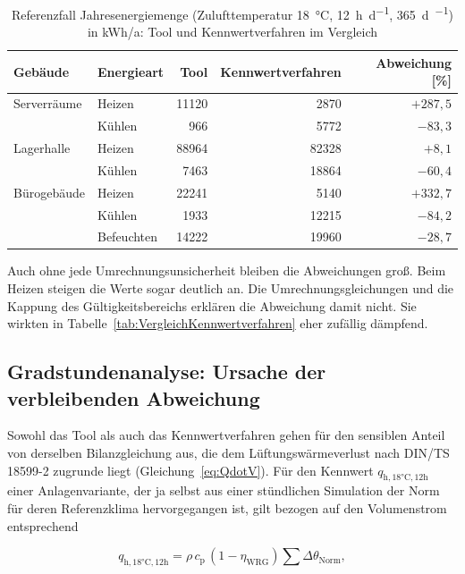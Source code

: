 \documentclass{scrreprt}
\begin{document}
\begin{table}[H]
    \centering
    \caption{Referenzfall Jahresenergiemenge (Zulufttemperatur \SI{18}{\celsius}, \SI{12}{\hour\per\day}, \SI{365}{\day\per\year}) in kWh/a: Tool und Kennwertverfahren im Vergleich}
    \label{tab:Referenzfall}
    \begin{tabular}{llrrr}
        \toprule
        Gebäude & Energieart & Tool & Kennwertverfahren & Abweichung [\%] \\
        \midrule
        Serverräume & Heizen & \num{11120} & \num{2870} & $+287{,}5$ \\
                    & Kühlen & \num{966} & \num{5772} & $-83{,}3$ \\
        \midrule
        Lagerhalle & Heizen & \num{88964} & \num{82328} & $+8{,}1$ \\
                   & Kühlen & \num{7463} & \num{18864} & $-60{,}4$ \\
        \midrule
        Bürogebäude & Heizen & \num{22241} & \num{5140} & $+332{,}7$ \\
                    & Kühlen & \num{1933} & \num{12215} & $-84{,}2$ \\
                    & Befeuchten & \num{14222} & \num{19960} & $-28{,}7$ \\
        \bottomrule
    \end{tabular}
\end{table}

Auch ohne jede Umrechnungsunsicherheit bleiben die Abweichungen groß. Beim Heizen steigen die Werte sogar deutlich an. Die
Umrechnungsgleichungen und die Kappung des Gültigkeitsbereichs
erklären die Abweichung damit nicht. Sie wirkten in
Tabelle~\ref{tab:VergleichKennwertverfahren} eher zufällig dämpfend.

\subsection{Gradstundenanalyse: Ursache der verbleibenden Abweichung}
Sowohl das Tool als auch das Kennwertverfahren gehen für den
sensiblen Anteil von derselben Bilanzgleichung aus, die dem
Lüftungswärmeverlust nach DIN/TS 18599-2 zugrunde liegt
(Gleichung~\eqref{eq:QdotV}). Für den Kennwert
$q_{\mathrm{h,18°C,12h}}$ einer Anlagenvariante, der ja selbst aus
einer stündlichen Simulation der Norm für deren Referenzklima
hervorgegangen ist, gilt bezogen auf den Volumenstrom entsprechend

\begin{equation}\label{eq:qh_gradstunden}
    q_{\mathrm{h,18°C,12h}} = \rho \, c_{\mathrm{p}} \, (1-\eta_{\mathrm{WRG}}) \sum \Delta\theta_{\mathrm{Norm}},
\end{equation}
\end{document}
